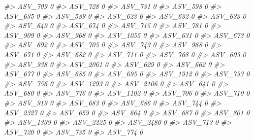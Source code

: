 \documentclass[
]{article}
\newenvironment{Shaded}{\begin{snugshade}}{\end{snugshade}}
\newcommand{\CommentTok}[1]{\textcolor[rgb]{0.56,0.35,0.01}{\textit{#1}}}
\begin{document}
\begin{Shaded}
\begin{Highlighting}[]
\CommentTok{\#\textgreater{} ASV\_709   0}
\CommentTok{\#\textgreater{} ASV\_728   0}
\CommentTok{\#\textgreater{} ASV\_731   0}
\CommentTok{\#\textgreater{} ASV\_598   0}
\CommentTok{\#\textgreater{} ASV\_635   0}
\CommentTok{\#\textgreater{} ASV\_589   0}
\CommentTok{\#\textgreater{} ASV\_623   0}
\CommentTok{\#\textgreater{} ASV\_632   0}
\CommentTok{\#\textgreater{} ASV\_633   0}
\CommentTok{\#\textgreater{} ASV\_649   0}
\CommentTok{\#\textgreater{} ASV\_674   0}
\CommentTok{\#\textgreater{} ASV\_715   0}
\CommentTok{\#\textgreater{} ASV\_781   0}
\CommentTok{\#\textgreater{} ASV\_909   0}
\CommentTok{\#\textgreater{} ASV\_968   0}
\CommentTok{\#\textgreater{} ASV\_1055  0}
\CommentTok{\#\textgreater{} ASV\_631   0}
\CommentTok{\#\textgreater{} ASV\_673   0}
\CommentTok{\#\textgreater{} ASV\_692   0}
\CommentTok{\#\textgreater{} ASV\_705   0}
\CommentTok{\#\textgreater{} ASV\_743   0}
\CommentTok{\#\textgreater{} ASV\_988   0}
\CommentTok{\#\textgreater{} ASV\_671   0}
\CommentTok{\#\textgreater{} ASV\_682   0}
\CommentTok{\#\textgreater{} ASV\_711   0}
\CommentTok{\#\textgreater{} ASV\_768   0}
\CommentTok{\#\textgreater{} ASV\_603   0}
\CommentTok{\#\textgreater{} ASV\_938   0}
\CommentTok{\#\textgreater{} ASV\_2061  0}
\CommentTok{\#\textgreater{} ASV\_629   0}
\CommentTok{\#\textgreater{} ASV\_662   0}
\CommentTok{\#\textgreater{} ASV\_677   0}
\CommentTok{\#\textgreater{} ASV\_685   0}
\CommentTok{\#\textgreater{} ASV\_695   0}
\CommentTok{\#\textgreater{} ASV\_1912  0}
\CommentTok{\#\textgreater{} ASV\_733   0}
\CommentTok{\#\textgreater{} ASV\_756   0}
\CommentTok{\#\textgreater{} ASV\_1293  0}
\CommentTok{\#\textgreater{} ASV\_2106  0}
\CommentTok{\#\textgreater{} ASV\_641   0}
\CommentTok{\#\textgreater{} ASV\_680   0}
\CommentTok{\#\textgreater{} ASV\_776   0}
\CommentTok{\#\textgreater{} ASV\_1102  0}
\CommentTok{\#\textgreater{} ASV\_706   0}
\CommentTok{\#\textgreater{} ASV\_710   0}
\CommentTok{\#\textgreater{} ASV\_919   0}
\CommentTok{\#\textgreater{} ASV\_683   0}
\CommentTok{\#\textgreater{} ASV\_686   0}
\CommentTok{\#\textgreater{} ASV\_744   0}
\CommentTok{\#\textgreater{} ASV\_2327  0}
\CommentTok{\#\textgreater{} ASV\_659   0}
\CommentTok{\#\textgreater{} ASV\_664   0}
\CommentTok{\#\textgreater{} ASV\_687   0}
\CommentTok{\#\textgreater{} ASV\_801   0}
\CommentTok{\#\textgreater{} ASV\_1339  0}
\CommentTok{\#\textgreater{} ASV\_2225  0}
\CommentTok{\#\textgreater{} ASV\_2480  0}
\CommentTok{\#\textgreater{} ASV\_713   0}
\CommentTok{\#\textgreater{} ASV\_720   0}
\CommentTok{\#\textgreater{} ASV\_735   0}
\CommentTok{\#\textgreater{} ASV\_774   0}

\end{Highlighting}
\end{Shaded}
\end{document}
